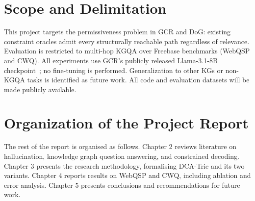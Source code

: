\section{Scope and Delimitation}

This project targets the permissiveness problem in GCR and DoG: existing constraint oracles admit every structurally reachable path regardless of relevance. Evaluation is restricted to multi-hop KGQA over Freebase benchmarks (WebQSP and CWQ). All experiments use GCR's publicly released Llama-3.1-8B checkpoint~\citep{luo2025-graph-constrained-reasoning}; no fine-tuning is performed. Generalization to other KGs or non-KGQA tasks is identified as future work. All code and evaluation datasets will be made publicly available.

\section{Organization of the Project Report}

The rest of the report is organised as follows. Chapter 2 reviews literature on hallucination, knowledge graph question answering, and constrained decoding. Chapter 3 presents the research methodology, formalising DCA-Trie and its two variants. Chapter 4 reports results on WebQSP and CWQ, including ablation and error analysis. Chapter 5 presents conclusions and recommendations for future work.